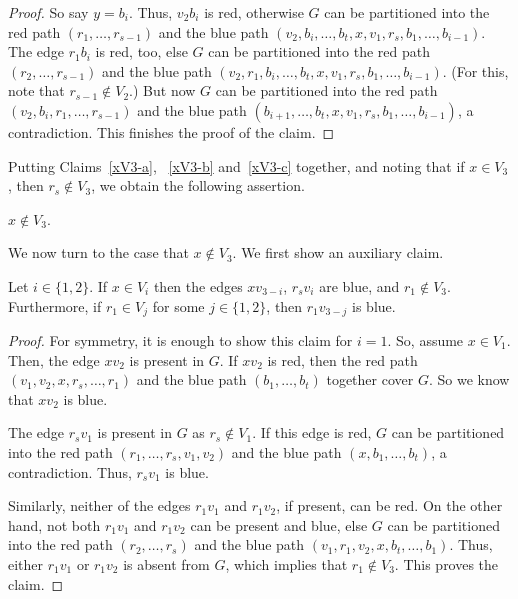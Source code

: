 \documentclass[a4paper,10pt]{article}
\begin{document}
\begin{proof}
So say $y = b_i$.
Thus, $v_2b_i$ is red, otherwise $G$ can be partitioned into the red path $(r_1,\ldots,r_{s-1})$ and the blue path $(v_2,b_i,\ldots,b_t,x,v_1,r_s,b_1,\ldots,b_{i-1})$.
The edge $r_1b_i$ is red, too, else $G$ can be partitioned into the red path $(r_2,\ldots,r_{s-1})$ and the blue path $(v_2,r_1,b_i,\ldots,b_t,x,v_1,r_s,b_1,\ldots,b_{i-1})$. 
(For this, note that $r_{s-1}\notin V_2$.)
But now $G$ can be partitioned into the red path $(v_2,b_i,r_1,\ldots,r_{s-1})$ and the blue path $(b_{i+1},\ldots,b_t,x,v_1,r_s,b_1,\ldots,b_{i-1})$, a contradiction. This finishes the proof of the claim.
\end{proof}

Putting Claims~\ref{xV3-a}, ~\ref{xV3-b} and~\ref{xV3-c} together, and noting that if $x\in V_3$, then $r_s\notin V_3$, we obtain the following assertion.
\begin{claim}\label{xnotinV3}
$x\notin V_3$.
\end{claim}

We now turn to the case that $x\notin V_3$.
We first show an auxiliary claim.

\begin{claim}\label{xinV1r1nichtinV3}
Let $i\in\{1,2\}$. If $x\in V_i$ then the edges $xv_{3-i}$, $r_sv_i$ are blue, and $r_1\notin V_{3}$. Furthermore, if $r_1\in V_j$ for some $j\in\{1,2\}$, then $r_1v_{3-j}$ is blue.
\end{claim}

\begin{proof}
For symmetry, it is enough to show this claim for $i=1$. So, assume $x\in V_1$.
Then, the edge $xv_2$ is present in $G$.
If $xv_2$ is red, then the red path $(v_1,v_2,x,r_s,\ldots,r_1)$ and the blue path $(b_1,\ldots,b_t)$ together cover $G$. So we know that 
$xv_2$ is blue.

The edge $r_sv_1$ is present in $G$ as $r_s \notin V_1$.
If this edge is red, $G$ can be partitioned into the red path $(r_1,\ldots,r_s,v_1,v_2)$ and the blue path $(x,b_1,\ldots,b_t)$, a contradiction.
Thus, 
$r_sv_1$ is blue.

Similarly, neither of the edges $r_1v_1$ and $r_1v_2$, if present, can be red.
On the other hand, not both $r_1v_1$ and $r_1v_2$ can be present and blue, else $G$ can be partitioned into the red path $(r_2,\ldots,r_s)$ and the blue path $(v_1,r_1,v_2,x,b_t,\ldots,b_1)$.
Thus, either $r_1v_1$ or $r_1v_2$ is absent from $G$, which implies that $r_1 \notin V_3$. This proves the claim.
\end{proof}
\end{document}
